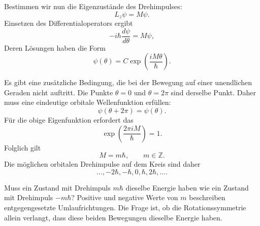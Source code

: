 \begin{classroomqa}
\end{classroomqa}

Bestimmen wir nun die Eigenzustände des Drehimpulses:
\begin{equation}
L_z\psi=M\psi.
\end{equation}
Einsetzen des Differentialoperators ergibt
\begin{equation}
-i\hbar\frac{d\psi}{d\theta}=M\psi,
\end{equation}
Deren Lösungen haben die Form
\begin{equation}
\psi(\theta)=C\exp\left(\frac{iM\theta}{\hbar}\right).
\end{equation}

Es gibt eine zusätzliche Bedingung, die bei der Bewegung auf einer unendlichen Geraden nicht auftritt. Die Punkte \(\theta=0\) und \(\theta=2\pi\) sind derselbe Punkt. Daher muss eine eindeutige orbitale Wellenfunktion erfüllen:
\begin{equation}
\psi(\theta+2\pi)=\psi(\theta).
\end{equation}
Für die obige Eigenfunktion erfordert das
\begin{equation}
\exp\left(\frac{2\pi iM}{\hbar}\right)=1.
\end{equation}
Folglich gilt
\begin{equation}
M=m\hbar,
\qquad
m\in\mathbb Z.
\end{equation}
Die möglichen orbitalen Drehimpulse auf dem Kreis sind daher
\begin{equation}
\ldots,-2\hbar,-\hbar,0,\hbar,2\hbar,\ldots.
\end{equation}

Muss ein Zustand mit Drehimpuls \(m\hbar\) dieselbe Energie haben wie ein Zustand mit Drehimpuls \(-m\hbar\)? Positive und negative Werte von \(m\) beschreiben entgegengesetzte Umlaufrichtungen. Die Frage ist, ob die Rotationssymmetrie allein verlangt, dass diese beiden Bewegungen dieselbe Energie haben.

\begin{classroomqa}
\end{classroomqa}

